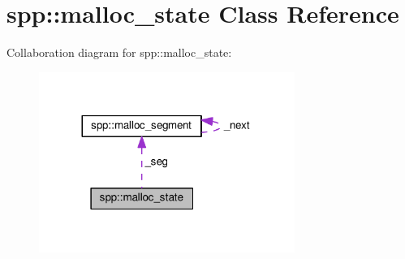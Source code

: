 \hypertarget{classspp_1_1malloc__state}{}\section{spp\+:\+:malloc\+\_\+state Class Reference}
\label{classspp_1_1malloc__state}


Collaboration diagram for spp\+:\+:malloc\+\_\+state\+:\nopagebreak
\begin{figure}[H]
\begin{center}
\leavevmode
\includegraphics[width=236pt]{classspp_1_1malloc__state__coll__graph}
\end{center}
\end{figure}
